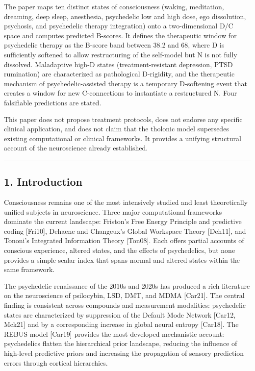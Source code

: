 \documentclass[
  11pt,
  letterpaper,
]{article}
\begin{document}
The paper maps ten distinct states of consciousness (waking, meditation,
dreaming, deep sleep, anesthesia, psychedelic low and high dose, ego
dissolution, psychosis, and psychedelic therapy integration) onto a
two-dimensional D/C space and computes predicted B-scores. It defines
the therapeutic window for psychedelic therapy as the B-score band
between 38.2 and 68, where D is sufficiently softened to allow
restructuring of the self-model but N is not fully dissolved.
Maladaptive high-D states (treatment-resistant depression, PTSD
rumination) are characterized as pathological D-rigidity, and the
therapeutic mechanism of psychedelic-assisted therapy is a temporary
D-softening event that creates a window for new C-connections to
instantiate a restructured N. Four falsifiable predictions are stated.

This paper does not propose treatment protocols, does not endorse any
specific clinical application, and does not claim that the tholonic
model supersedes existing computational or clinical frameworks. It
provides a unifying structural account of the neuroscience already
established.

\begin{center}\rule{0.5\linewidth}{0.5pt}\end{center}

\subsection{1. Introduction}\label{introduction}

Consciousness remains one of the most intensively studied and least
theoretically unified subjects in neuroscience. Three major
computational frameworks dominate the current landscape: Friston's Free
Energy Principle and predictive coding {[}Fri10{]}, Dehaene and
Changeux's Global Workspace Theory {[}Deh11{]}, and Tononi's Integrated
Information Theory {[}Ton08{]}. Each offers partial accounts of
conscious experience, altered states, and the effects of psychedelics,
but none provides a simple scalar index that spans normal and altered
states within the same framework.

The psychedelic renaissance of the 2010s and 2020s has produced a rich
literature on the neuroscience of psilocybin, LSD, DMT, and MDMA
{[}Car21{]}. The central finding is consistent across compounds and
measurement modalities: psychedelic states are characterized by
suppression of the Default Mode Network {[}Car12, Mck21{]} and by a
corresponding increase in global neural entropy {[}Car18{]}. The REBUS
model {[}Car19{]} provides the most developed mechanistic account:
psychedelics flatten the hierarchical prior landscape, reducing the
influence of high-level predictive priors and increasing the propagation
of sensory prediction errors through cortical hierarchies.
\end{document}
